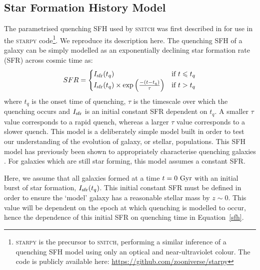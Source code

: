 \documentclass[useAMS,usenatbib]{mn2e}
\begin{document}
\subsection{Star Formation History Model}\label{sec:sfh}

The parametrised quenching SFH used by \textsc{snitch} was first described in \cite{smethurst15} for use in the \textsc{starpy} code\footnote{\textsc{starpy} is the precursor to \textsc{snitch}, performing a similar inference of a quenching SFH model using only an optical and near-ultraviolet colour. The code is publicly available here: \url{https://github.com/zooniverse/starpy}}. We reproduce its description here. The quenching SFH of a galaxy can be simply modelled as an exponentially declining star formation rate (SFR) across cosmic time as:
\begin{equation}\label{sfh}
SFR =
\begin{cases}
I_{\rm{sfr}}(t_q) & \text{if } t \leq t_q \\
I_{\rm{sfr}}(t_q) \times \exp{\left( \frac{-(t-t_{q})}{\tau}\right)} & \text{if } t > t_q 
\end{cases}
\end{equation}
where $t_{q}$ is the onset time of quenching, $\tau$ is the timescale over which the quenching occurs and $I_{\rm{sfr}}$ is an initial constant SFR dependent on $t_q$.  A smaller $\tau$ value corresponds to a rapid quench, whereas a larger $\tau$ value corresponds to a slower quench. This model is a deliberately simple model built in order to test our understanding of the evolution of galaxy, or stellar, populations. This SFH model has previously been shown to appropriately characterise quenching galaxies \citep{weiner06, martin07, noeske07,schawinski14, smethurst15}. For galaxies which are still star forming, this model assumes a constant SFR.



Here, we assume that all galaxies formed at a time $t=0~\rm{Gyr}$ with an initial burst of star formation, $I_{\rm{sfr}}(t_q)$. This initial constant SFR must be defined in order to ensure the `model' galaxy  has a reasonable stellar mass by $z\sim0$. This value will be dependent on the epoch at which quenching is modelled to occur, hence the dependence of this initial SFR on quenching time in Equation~\ref{sfh}. 
\end{document}
